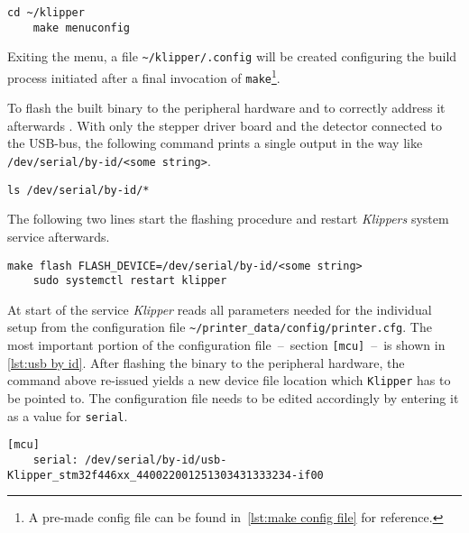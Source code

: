         \begin{lstlisting}[style=mybash, numbers=none]
    cd ~/klipper
    make menuconfig
        \end{lstlisting}

        Exiting the menu, a file \texttt{\textasciitilde/klipper/.config} will be created configuring the build process initiated after a final invocation of \texttt{make}\footnote{A pre-made config file can be found in~\cref{lst:make config file} for reference.}.\par\medskip

        To flash the built binary to the peripheral hardware and to correctly address it afterwards . With only the stepper driver board and the detector connected to the USB-bus, the following command prints a single output in the way like \texttt{/dev/serial/by-id/<some string>}.

        \begin{lstlisting}[style=mybash, numbers=none]
    ls /dev/serial/by-id/*
        \end{lstlisting}
        
        The following two lines start the flashing procedure and restart \textit{Klippers} system service afterwards.
        
        \begin{lstlisting}[style=mybash, numbers=none]
    make flash FLASH_DEVICE=/dev/serial/by-id/<some string>
    sudo systemctl restart klipper
        \end{lstlisting}

        At start of the service \textit{Klipper} reads all parameters needed for the individual setup from the configuration file \texttt{\textasciitilde/printer\_data/config/printer.cfg}.
        The most important portion of the configuration file~--~section \texttt{[mcu]}~--~is shown in \cref{lst:usb by id}.
        After flashing the binary to the peripheral hardware, the command above re-issued yields a new device file location which \texttt{Klipper} has to be pointed to.
        The configuration file needs to be edited accordingly by entering it as a value for \texttt{serial}.

        \begin{lstlisting}[style=mydjango, firstnumber=7,
            caption={[\texttt{mcu}-section of \texttt{printer.cfg} showing the id of the connected serial device]\texttt{mcu}-section of the \texttt{printer.cfg} showing the id of the connected serial device.},
            label={lst:usb by id}%
            ]
    [mcu]
    serial: /dev/serial/by-id/usb-Klipper_stm32f446xx_440022001251303431333234-if00
        \end{lstlisting}

